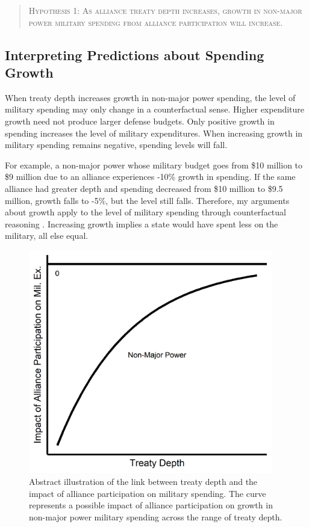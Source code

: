 \documentclass[12pt]{article}
\begin{document}
\begin{quote}
\textsc{Hypothesis 1: As alliance treaty depth increases, growth in non-major power military spending from alliance participation will increase.}
\end{quote}



\subsection{Interpreting Predictions about Spending Growth}


When treaty depth increases growth in non-major power spending, the level of military spending may only change in a counterfactual sense. 
Higher expenditure growth need not produce larger defense budgets. 
Only positive growth in spending increases the level of military expenditures. 
When increasing growth in military spending remains negative, spending levels will fall. 


For example, a non-major power whose military budget goes from \$10 million to \$9 million due to an alliance experiences -10\% growth in spending. 
If the same alliance had greater depth and spending decreased from \$10 million to \$9.5 million, growth falls to -5\%, but the level still falls. 
Therefore, my arguments about growth apply to the level of military spending through counterfactual reasoning \cite{Fearon1991}. 
Increasing growth implies a state would have spent less on the military, all else equal.


\begin{figure}[htbp]
	\centering
		\includegraphics[width=0.95\textwidth]{../figures/illus-arg.png}
	\caption{Abstract illustration of the link between treaty depth and the impact of alliance participation on military spending.
	The curve represents a possible impact of alliance participation on growth in non-major power military spending across the range of treaty depth.}
	\label{fig:illus-arg}
\end{figure}
\end{document}
